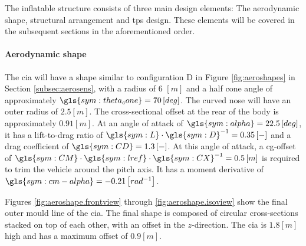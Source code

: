 The inflatable structure consists of three main design elements: The aerodynamic shape, structural arrangement and \gls{tps} design. These elements will be covered in the subsequent sections in the aforementioned order.

\paragraph{Aerodynamic shape}
The \gls{cia} will have a shape similar to configuration D in Figure \ref{fig:aeroshapes} in Section \ref{subsec:aerosens}, with a radius of $6$ $\left[m\right]$ and a half cone angle of approximately $\gls{sym:theta_cone} = 70 \left[deg\right]$. The curved nose will have an outer radius of $2.5 \left[m\right]$. The cross-sectional offset at the rear of the body is approximately $0.91 \left[m\right]$. At an angle of attack of $\gls{sym:alpha} = 22.5 \left[deg\right]$, it has a lift-to-drag ratio of $\gls{sym:L} \cdot \gls{sym:D}^{-1} = 0.35\left[-\right]$ and a drag coefficient of $\gls{sym:CD} = 1.3 \left[-\right]$. At this angle of attack, a \gls{cg}-offset of $\gls{sym:CM}\cdot \gls{sym:lref} \cdot \gls{sym:CX}^{-1} = 0.5 \left[m\right]$ is required to trim the vehicle around the pitch axis. It has a moment derivative of $\gls{sym:cm-alpha} = -0.21 \left[rad^{-1}\right]$. 

 Figures \ref{fig:aeroshape.frontview} through \ref{fig:aeroshape.isoview} show the final outer mould line of the \gls{cia}. The final shape is composed of circular cross-sections stacked on top of each other, with an offset in the $z$-direction. The \gls{cia} is $1.8 \left[m\right]$ high and has a maximum offset of $0.9 \left[m\right]$.
 

